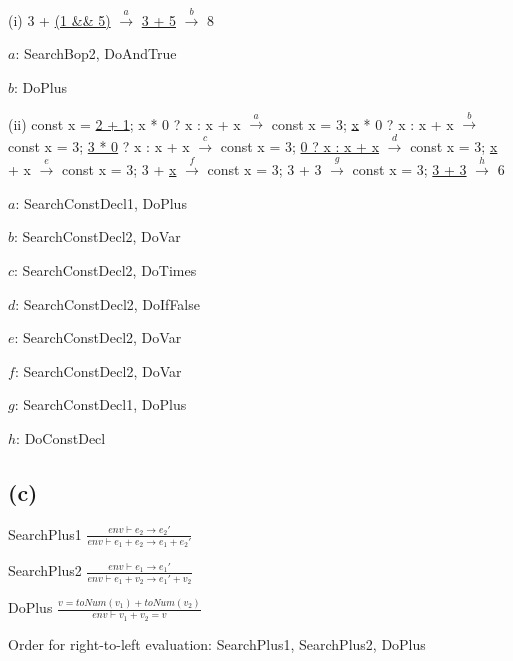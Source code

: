 \documentclass[11pt, oneside]{article}
\let\emptyset\varnothing
\newcommand{\forceindent}{\leavevmode{\parindent=1.5em\indent}}
\begin{document}

\forceindent \par (i) 3 + \underline{(1 \&\& 5)} $\xrightarrow{a}$ \underline{3 + 5} $\xrightarrow{b}$ 8
\par $a$: SearchBop2, DoAndTrue
\par $b$: DoPlus

\vspace{1.5\baselineskip}



\par (ii) const x =
 \underline{2 + 1}; x * 0 ? x : x + x $\xrightarrow{a}$ 
 const x = 3; \underline{x} * 0 ? x : x + x $\xrightarrow{b}$
 const x = 3; \underline{3 * 0} ? x : x + x $\xrightarrow{c}$
 const x = 3; \underline{0 ? x : x + x} $\xrightarrow{d}$
 const x = 3; \underline{x} + x $\xrightarrow{e}$
 const x = 3; 3 + \underline{x} $\xrightarrow{f}$
  const x = 3; 3 + 3 $\xrightarrow{g}$
 const x = 3; \underline{3 + 3} $\xrightarrow{h}$
 6
\par $a$: SearchConstDecl1, DoPlus
\par $b$: SearchConstDecl2, DoVar
\par $c$: SearchConstDecl2, DoTimes
\par $d$: SearchConstDecl2, DoIfFalse
\par $e$: SearchConstDecl2, DoVar
\par $f$: SearchConstDecl2, DoVar
\par $g$: SearchConstDecl1, DoPlus
\par $h$: DoConstDecl

\subsection*{(c)}
\forceindent \par 
\par SearchPlus1
$
\frac{
	env \vdash e_2 \rightarrow e_2'
}
{
	env \vdash e_1 + e_2 \rightarrow e_1 + e_2'
}
$
\par SearchPlus2
$
\frac{
	env \vdash e_1 \rightarrow e_1'
}
{
	env \vdash e_1 + v_2 \rightarrow e_1' + v_2
}
$
\par DoPlus
$
\frac{
	v = toNum(v_1) + toNum(v_2)
}
{
	env \vdash v_1 + v_2 = v
}
$
\par Order for right-to-left evaluation: SearchPlus1, SearchPlus2, DoPlus
\end{document}
